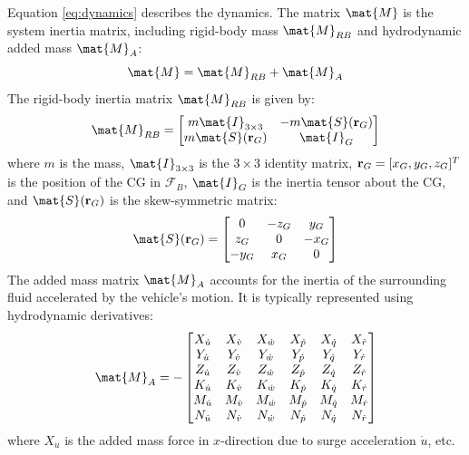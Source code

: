 Equation \eqref{eq:dynamics} describes the dynamics. The matrix $\mat{M}$ is the system inertia matrix, including rigid-body mass $\mat{M}_{RB}$ and hydrodynamic added mass $\mat{M}_A$:
\begin{equation}
    \mat{M} = \mat{M}_{RB} + \mat{M}_A
\end{equation}
The rigid-body inertia matrix $\mat{M}_{RB}$ is given by:
\begin{equation}
    \mat{M}_{RB} =
    \begin{bmatrix}
        m\mat{I}_{3\times3} & -m\mat{S}(\vect{r}_G) \\
        m\mat{S}(\vect{r}_G) & \mat{I}_G
    \end{bmatrix}
\end{equation}
where $m$ is the mass, $\mat{I}_{3\times3}$ is the $3 \times 3$ identity matrix, $\mathbf{r}_G = [x_G, y_G, z_G]^T$ is the position of the CG in $\mathcal{F}_B$, $\mat{I}_G$ is the inertia tensor about the CG, and $\mat{S}(\vect{r}_G)$ is the skew-symmetric matrix:
\begin{equation}
    \mat{S}(\vect{r}_G) =
    \begin{bmatrix}
        0 & -z_G & y_G \\
        z_G & 0 & -x_G \\
        -y_G & x_G & 0
    \end{bmatrix}
\end{equation}
The added mass matrix $\mat{M}_A$ accounts for the inertia of the surrounding fluid accelerated by the vehicle's motion. It is typically represented using hydrodynamic derivatives:
\begin{equation}
    \mat{M}_{A} = -
    \begin{bmatrix}
        X_{\dot{u}} & X_{\dot{v}} & X_{\dot{w}} & X_{\dot{p}} & X_{\dot{q}} & X_{\dot{r}} \\
        Y_{\dot{u}} & Y_{\dot{v}} & Y_{\dot{w}} & Y_{\dot{p}} & Y_{\dot{q}} & Y_{\dot{r}} \\
        Z_{\dot{u}} & Z_{\dot{v}} & Z_{\dot{w}} & Z_{\dot{p}} & Z_{\dot{q}} & Z_{\dot{r}} \\
        K_{\dot{u}} & K_{\dot{v}} & K_{\dot{w}} & K_{\dot{p}} & K_{\dot{q}} & K_{\dot{r}} \\
        M_{\dot{u}} & M_{\dot{v}} & M_{\dot{w}} & M_{\dot{p}} & M_{\dot{q}} & M_{\dot{r}} \\
        N_{\dot{u}} & N_{\dot{v}} & N_{\dot{w}} & N_{\dot{p}} & N_{\dot{q}} & N_{\dot{r}}
    \end{bmatrix}
\end{equation}
where $X_{\dot{u}}$ is the added mass force in $x$-direction due to surge acceleration $\dot{u}$, etc.

